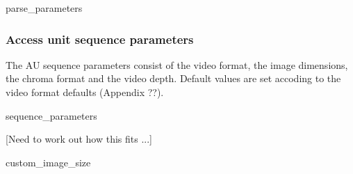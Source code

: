 \begin{pseudo}{parse\_parameters}{}
\bsITEM{\VersionMinor]}{unsigned}{}

\end{pseudo}


\subsubsection{Access unit sequence parameters}

The AU sequence parameters consist of the video format, the
image dimensions, the chroma format and the video depth. Default values are
set accoding to the video format defaults (Appendix ??).


\begin{pseudo}{sequence\_parameters}{}
\end{pseudo}

[Need to work out how this fits ...]
\begin{pseudo}{custom\_image\_size}{}
\bsIF{\CustomImageSize}
\bsEND
\end{pseudo}

